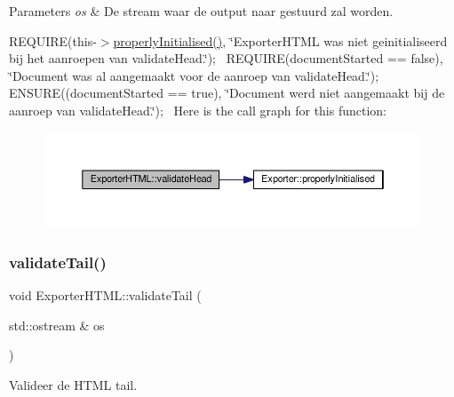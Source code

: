 \begin{DoxyParams}{Parameters}
{\em os} & De stream waar de output naar gestuurd zal worden.\\
\hline
\end{DoxyParams}
R\+E\+Q\+U\+I\+RE(this-\/$>$\hyperlink{class_exporter_aafd9df9210aeefd7bb7fd434fc317cf0}{properly\+Initialised()}, \char`\"{}\+Exporter\+H\+T\+M\+L was niet geinitialiseerd bij het aanroepen van validate\+Head.\char`\"{});~\newline
R\+E\+Q\+U\+I\+RE(document\+Started == false), \char`\"{}\+Document was al aangemaakt voor de aanroep van validate\+Head.\char`\"{});~\newline
E\+N\+S\+U\+RE((document\+Started == true), \char`\"{}\+Document werd niet aangemaakt bij de aanroep van validate\+Head.\char`\"{});~\newline
Here is the call graph for this function\+:
\nopagebreak
\begin{figure}[H]
\begin{center}
\leavevmode
\includegraphics[width=350pt]{class_exporter_h_t_m_l_a2c8b00996daf897449a15d87fa7c0e13_cgraph}
\end{center}
\end{figure}
\mbox{\label{class_exporter_h_t_m_l_a82a0ea3877a2ea4b167281016c46f4ad}} 
\subsubsection{\texorpdfstring{validate\+Tail()}{validateTail()}}
{\footnotesize\ttfamily void Exporter\+H\+T\+M\+L\+::validate\+Tail (\begin{DoxyParamCaption}\item[{std\+::ostream \&}]{os }\end{DoxyParamCaption})}



Valideer de H\+T\+ML tail. 


